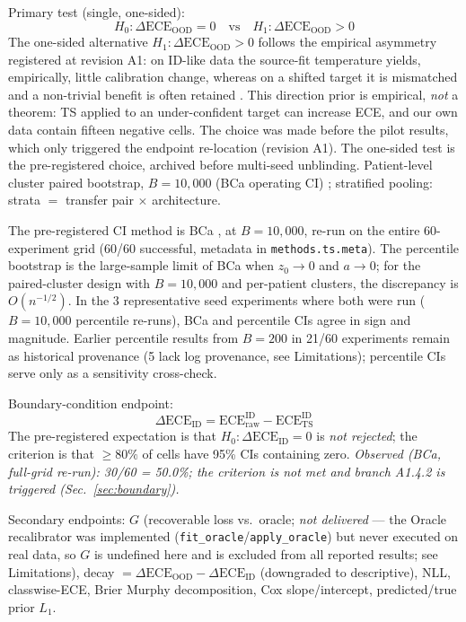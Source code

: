 \documentclass[final,5p,times,nonatbib]{elsarticle}
\begin{document}
Primary test (single, one-sided):
\begin{equation}
    H_0: \Delta\text{ECE}_{\text{OOD}} = 0
    \quad\text{vs}\quad
    H_1: \Delta\text{ECE}_{\text{OOD}} > 0
\end{equation}
The one-sided alternative
$H_1: \Delta\text{ECE}_{\text{OOD}} > 0$ follows the empirical
asymmetry registered at revision A1: on ID-like data the source-fit
temperature yields, empirically, little calibration change, whereas
on a shifted target it is mismatched and a non-trivial benefit is
often retained \cite{guo2017calibration,ovadia2019calibration}. This
direction prior is empirical, \emph{not} a theorem: TS applied to an
under-confident target can increase ECE, and our own data contain
fifteen negative cells. The choice was made before the pilot results,
which only triggered the endpoint re-location (revision A1). The
one-sided test is the pre-registered choice, archived before
multi-seed unblinding.
Patient-level cluster paired bootstrap, $B=10{,}000$ (BCa
operating CI) \cite{efron1987bca}; stratified pooling: strata $=$ transfer pair
$\times$ architecture.

The pre-registered
CI method is BCa \cite{efron1987bca}, at $B=10{,}000$,
re-run on the entire 60-experiment grid (60/60 successful, metadata
in \texttt{methods.ts.meta}). The percentile bootstrap is the
large-sample limit of BCa when $z_0\to 0$ and $a\to 0$; for the
paired-cluster design with $B=10{,}000$ and per-patient clusters,
the discrepancy is $O(n^{-1/2})$. In the 3 representative seed
experiments where both were run ($B=10{,}000$ percentile re-runs),
BCa and percentile CIs agree in sign and magnitude. Earlier
percentile results from $B=200$ in 21/60 experiments remain as
historical provenance (5 lack log provenance, see Limitations);
percentile CIs serve only as a sensitivity cross-check.

Boundary-condition endpoint:
\begin{equation}
    \Delta\text{ECE}_{\text{ID}}
    = \text{ECE}_{\mathrm{raw}}^{\mathrm{ID}} - \text{ECE}_{\mathrm{TS}}^{\mathrm{ID}}
\end{equation}
The pre-registered expectation is that $H_0: \Delta\text{ECE}_{\text{ID}} = 0$ is \emph{not rejected};
the criterion is that $\geq 80\%$ of cells have 95\% CIs containing zero.
\emph{Observed (BCa, full-grid re-run): 30/60 = 50.0\%; the criterion is
not met and branch A1.4.2 is triggered (Sec.~\ref{sec:boundary}).}

Secondary endpoints: $G$ (recoverable loss vs.\ oracle; \emph{not
delivered} --- the Oracle recalibrator was implemented
(\texttt{fit\_oracle}/\texttt{apply\_oracle}) but never executed on real
data, so $G$ is undefined here and is excluded from all reported
results; see Limitations), decay
$=\Delta\text{ECE}_{\text{OOD}}-\Delta\text{ECE}_{\text{ID}}$
(downgraded to descriptive), NLL, classwise-ECE, Brier Murphy
decomposition, Cox slope/intercept, predicted/true prior $L_1$.
\end{document}

